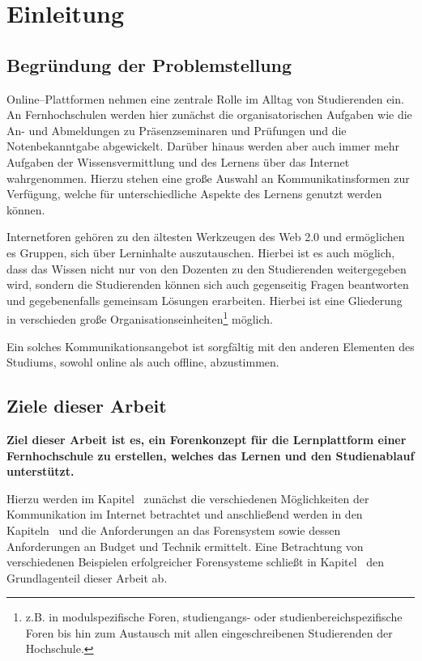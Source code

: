 \section{Einleitung} %
\label{sec:einleitung}

\subsection{Begründung der Problemstellung} %
\label{sub:begrundung_der_problemstellung}

Online--Plattformen nehmen eine zentrale Rolle im Alltag von Studierenden ein. An Fernhochschulen werden hier zunächst die organisatorischen Aufgaben wie die An- und Abmeldungen zu Präsenzseminaren und Prüfungen und die Notenbekanntgabe abgewickelt. Darüber hinaus werden aber auch immer mehr Aufgaben der Wissensvermittlung und des Lernens über das Internet wahrgenommen. Hierzu stehen eine große Auswahl an Kommunikatinsformen zur Verfügung, welche für unterschiedliche Aspekte des Lernens genutzt werden können.

Internetforen gehören zu den ältesten Werkzeugen des Web 2.0 und ermöglichen es Gruppen, sich über Lerninhalte auszutauschen. Hierbei ist es auch möglich, dass das Wissen nicht nur von den Dozenten zu den Studierenden weitergegeben wird, sondern die Studierenden können sich auch gegenseitig Fragen beantworten und gegebenenfalls gemeinsam Lösungen erarbeiten. Hierbei ist eine Gliederung in verschieden große Organisationseinheiten\footnote{z.B. in modulspezifische Foren, studiengangs- oder studienbereichspezifische Foren bis hin zum Austausch mit allen eingeschreibenen Studierenden der Hochschule.} möglich.

Ein solches Kommunikationsangebot ist sorgfältig mit den anderen Elementen des Studiums, sowohl online als auch offline, abzustimmen.

\subsection{Ziele dieser Arbeit} %
\label{sub:ziele_dieser_arbeit}
\textbf{Ziel dieser Arbeit ist es, ein Forenkonzept für die Lernplattform einer Fernhochschule zu erstellen, welches das Lernen und den Studienablauf unterstützt.}

Hierzu werden im Kapitel~ zunächst die verschiedenen Möglichkeiten der Kommunikation im Internet betrachtet und anschließend werden in den Kapiteln~ und  die Anforderungen an das Forensystem sowie dessen Anforderungen an Budget und Technik ermittelt. Eine Betrachtung von verschiedenen Beispielen erfolgreicher Forensysteme schließt in Kapitel~ den Grundlagenteil dieser Arbeit ab.

